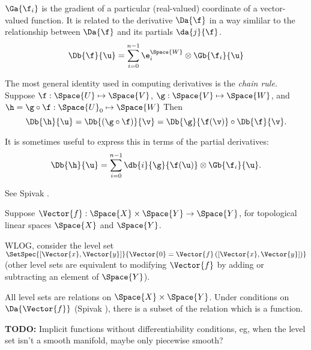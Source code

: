 $\Ga{\f_i}$ is the gradient of a particular (real-valued) coordinate
of a vector-valued function. It is related to the derivative $\Da{\f}$
in a way simlilar to the relationship between $\Da{\f}$ and its partials $\da{j}{\f}$.
\begin{equation}
\Db{\f}{\u} = \sum_{i=0}^{n-1}  \e_i^{\Space{W}} \otimes \Gb{\f_i}{\u}
\end{equation}

The most general identity used in computing derivatives is the \textit{chain rule.}
Suppose
$\f:\Space{U} \mapsto \Space{V}$,
$\g:\Space{V} \mapsto \Space{W}$,
and
$\h = \g \circ \f : \Space{U}_0 \mapsto \Space{W}$
Then
\begin{equation}
\label{eq:chain-rule}
\Db{\h}{\u}
=  \Db{(\g \circ \f)}{\v}
=  \Db{\g}{\f(\v)}  \circ  \Db{\f} {\v}.
\end{equation}

It is sometimes useful to express this in terms of the partial derivatives:
\begin{equation}
\label{eq:chain-rule_partials}
\Db{\h}{\u} =  \sum_{i=0}^{n-1} \db{i}{\g}{\f(\u)} \otimes  \Gb{\f_i}{\u}.
\end{equation}

See Spivak \cite[Theorem~2-2]{spivak-1965}.

\label{sec:Derivatives-of-Vector-valued-functions}

\label{sec:Derivatives-of-implicit-functions}

Suppose 
$\Vector{f} : \Space{X} \times \Space{Y} \rightarrow \Space{Y}$,
for topological linear spaces $\Space{X}$ and $\Space{Y}$.

WLOG, consider the level set 
$\SetSpec{\left[ \Vector{x} , \Vector{y} \right]}
{\Vector{0} = \Vector{f}\left( \left[ \Vector{x} , \Vector{y} \right] \right)}$
(other level sets are equivalent to modifying $\Vector{f}$
by adding or subtracting 
an element of $\Space{Y}$).

All level sets are relations on $\Space{X} \times \Space{Y}$.
Under conditions on $\Da{\Vector{f}}$
(Spivak \cite[Theorem~2-12]{spivak-1965}),
there is a subset of the relation which is a 
function.

\textbf{TODO:} Implicit functions without differentiability
conditions, eg, when the level set isn't a smooth manifold,
maybe only piecewise smooth?

